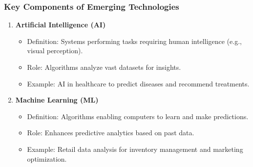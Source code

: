\documentclass[aspectratio=169]{beamer}
\begin{document}
\begin{frame}[fragile]
    \frametitle{Key Components of Emerging Technologies}
    \begin{enumerate}
        \item \textbf{Artificial Intelligence (AI)}
        \begin{itemize}
            \item Definition: Systems performing tasks requiring human intelligence (e.g., visual perception).
            \item Role: Algorithms analyze vast datasets for insights.
            \item Example: AI in healthcare to predict diseases and recommend treatments.
        \end{itemize}
        
        \item \textbf{Machine Learning (ML)}
        \begin{itemize}
            \item Definition: Algorithms enabling computers to learn and make predictions.
            \item Role: Enhances predictive analytics based on past data.
            \item Example: Retail data analysis for inventory management and marketing optimization.
        \end{itemize}
    \end{enumerate}
\end{frame}
\end{document}
